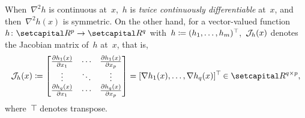 \documentclass[../main]{subfiles}
\begin{document}
When~$\nabla^2 h$ is continuous at~$x$,~$h$ is \emph{twice continuously differentiable} at~$x$, and then~$\nabla^2 h(x)$ is symmetric.
On the other hand, for a vector-valued function~$h \colon \setR^p \to \setR^q$ with~$h \coloneqq (h_1, \dots, h_m)^\top\hspace{-1pt}$,~$\mathcal{J}_{h}(x)$ denotes the Jacobian matrix of~$h$ at~$x$, that is,
\begin{equation} \label{eq:jac}
    \jdv{h}{x} \coloneqq
    \begin{bmatrix}
        \pdv{h_1(x)}{x_1} & \cdots & \pdv{h_1(x)}{x_p} \\
        \vdots & \ddots & \vdots \\
        \pdv{h_q(x)}{x_1} & \cdots & \pdv{h_q(x)}{x_p}
    \end{bmatrix} 
    = [ \nabla h_1(x), \dots, \nabla h_q(x) ]^\T \in \setR^{q \times p}
,\end{equation} 
where~$\top\hspace{-1pt}$ denotes transpose.
\end{document}
